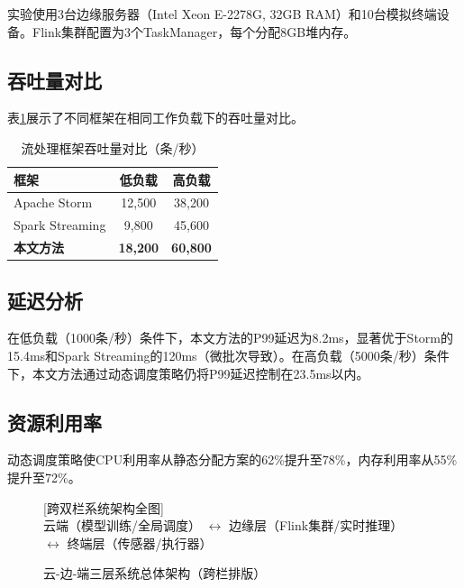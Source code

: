 \documentclass[twocolumn]{harryopo-paper}
\begin{document}
实验使用3台边缘服务器（Intel Xeon E-2278G, 32GB RAM）和10台模拟终端设备。Flink集群配置为3个TaskManager，每个分配8GB堆内存。

\subsection{吞吐量对比}

表\ref{tab:throughput}展示了不同框架在相同工作负载下的吞吐量对比。

\begin{table}[t]
\centering
\small
\begin{tabular}{lcc}
\toprule
\textbf{框架} & \textbf{低负载} & \textbf{高负载} \\
\midrule
Apache Storm & 12,500 & 38,200 \\
Spark Streaming & 9,800 & 45,600 \\
\textbf{本文方法} & \textbf{18,200} & \textbf{60,800} \\
\bottomrule
\end{tabular}
\caption{流处理框架吞吐量对比（条/秒）}
\label{tab:throughput}
\end{table}

\subsection{延迟分析}

在低负载（1000条/秒）条件下，本文方法的P99延迟为8.2ms，显著优于Storm的15.4ms和Spark Streaming的120ms（微批次导致）。在高负载（5000条/秒）条件下，本文方法通过动态调度策略仍将P99延迟控制在23.5ms以内。

\subsection{资源利用率}

动态调度策略使CPU利用率从静态分配方案的62\%提升至78\%，内存利用率从55\%提升至72\%。

\begin{figure}[t]
\centering
\colorbox{gray!8}{\parbox{0.9\textwidth}{\centering\vspace{3cm}
    {\Large\color{gray} [跨双栏系统架构全图]}\\[0.5cm]
    \small 云端（模型训练/全局调度） $\leftrightarrow$ 边缘层（Flink集群/实时推理） $\leftrightarrow$ 终端层（传感器/执行器）
\vspace{3cm}}}
\caption{云-边-端三层系统总体架构（跨栏排版）}
\label{fig:architecture_full}
\end{figure}
\end{document}
